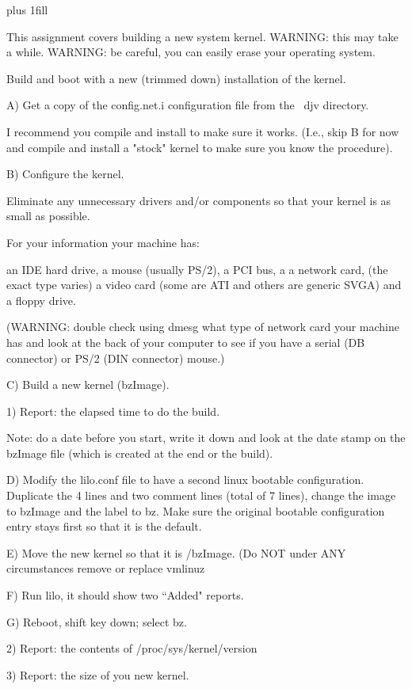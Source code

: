 
\rightskip=0pt plus 1fill

\parindent 0pt

This assignment covers building a new system kernel.
WARNING: this may take a while.
WARNING: be careful, you can easily erase your operating system.

Build and boot with a new (trimmed down) installation of the kernel.

A) Get a copy of the {\ltt{}config.net.i} configuration file from
the {\ltt{}~djv} directory. 

I recommend you compile and install to make sure it works.
(I.e., skip B for now and compile and install a "stock" kernel to
make sure you know the procedure).

B) Configure the kernel. 

Eliminate any unnecessary drivers and/or components so that your kernel is
as small as possible.

For your information your machine has:

an IDE hard drive, a mouse (usually PS/2), a PCI bus, a 
a network card, (the exact type varies)
a video card (some are ATI and others are generic SVGA) and a floppy drive.

(WARNING: double check using dmesg what type of network card your
machine has and look at the back of your computer to see
if you have a serial (DB connector) or PS/2 (DIN connector) mouse.)

C) Build a new kernel ({\ltt{}bzImage}).

1) Report: the elapsed time to do the build.

Note: do a date before you start, write it down and look at
the date stamp on the {\ltt{}bzImage} file (which is created at
the end or the build).

D) Modify the {\ltt{}lilo.conf} file to have a second linux
bootable configuration.
Duplicate the 4 lines and two comment lines (total of 7 lines),
change the image to {\ltt{}bzImage} and the label to {\ltt{}bz}.
Make sure the original bootable configuration entry stays first so that
it is the default.

E) Move the new kernel so that it is {\ltt{}/bzImage}.
(Do NOT under ANY circumstances remove or replace {\ltt{}vmlinuz}

F) Run lilo, it should show two ``Added" reports.

G) Reboot, shift key down; select bz.

2) Report: the contents of {\ltt{}/proc/sys/kernel/version} 

3) Report: the size of you new kernel.

\bye
